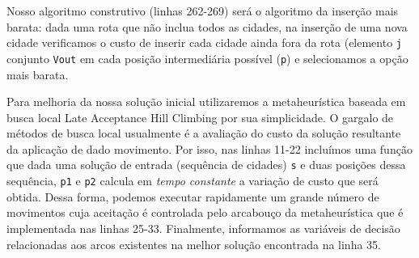 \documentclass[a4paper,11pt,fleqn]{article}
\begin{document}
Nosso algoritmo construtivo (linhas 262-269) será o algoritmo da inserção mais barata: dada uma rota que não inclua todos as cidades, na inserção de uma nova cidade verificamos o custo de inserir cada cidade ainda fora da rota (elemento \texttt{j} conjunto \texttt{Vout} em cada posição intermediária possível (\texttt{p}) e selecionamos a opção mais barata.

Para melhoria da nossa solução inicial utilizaremos a metaheurística baseada em busca local Late Acceptance Hill Climbing \citep{burke2017} por sua simplicidade. O gargalo de métodos de busca local usualmente é a avaliação do custo da solução resultante da aplicação de dado movimento. Por isso, nas linhas 11-22 incluímos uma função que dada uma solução de entrada (sequência de cidades) \texttt{s} e duas posições dessa sequência, \texttt{p1} e \texttt{p2} calcula em \emph{tempo constante} a variação de custo que será obtida. Dessa forma, podemos executar rapidamente um grande número de movimentos cuja aceitação é controlada pelo arcabouço da metaheurística que é implementada nas linhas 25-33. Finalmente, informamos as variáveis de decisão relacionadas aos arcos existentes na melhor solução encontrada na linha 35.


		


\end{document}
